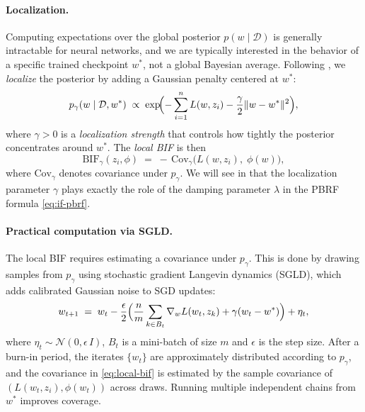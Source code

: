 \documentclass[11pt]{article}
\begin{document}
\paragraph{Localization.} Computing expectations over the global posterior $p(w\mid\mathcal{D})$ is generally intractable for neural networks, and we are typically interested in the behavior of a specific trained checkpoint $w^*$, not a global Bayesian average. Following \citet{kreer2025bif}, we \emph{localize} the posterior by adding a Gaussian penalty centered at $w^*$:
\begin{equation}\label{eq:local-posterior}
  p_\gamma(w\mid\mathcal{D},w^*) \;\propto\; \exp\!\Bigl(-\sum_{i=1}^n L(w,z_i) - \frac{\gamma}{2}\|w - w^*\|^2\Bigr),
\end{equation}
where $\gamma > 0$ is a \emph{localization strength} that controls how tightly the posterior concentrates around $w^*$. The \emph{local BIF} is then
\begin{equation}\label{eq:local-bif}
  \mathrm{BIF}_\gamma(z_i,\phi) \;=\; -\,\mathrm{Cov}_\gamma\bigl(L(w,z_i),\;\phi(w)\bigr),
\end{equation}
where $\mathrm{Cov}_\gamma$ denotes covariance under $p_\gamma$. We will see in  that the localization parameter $\gamma$ plays exactly the role of the damping parameter $\lambda$ in the PBRF formula \eqref{eq:if-pbrf}.

\paragraph{Practical computation via SGLD.} The local BIF requires estimating a covariance under $p_\gamma$. This is done by drawing samples from $p_\gamma$ using stochastic gradient Langevin dynamics (SGLD), which adds calibrated Gaussian noise to SGD updates:
\[
  w_{t+1} \;=\; w_t - \frac{\epsilon}{2}\Bigl(\frac{n}{m}\sum_{k\in B_t}\nabla_w L(w_t,z_k) + \gamma(w_t - w^*)\Bigr) + \eta_t,
\]
where $\eta_t\sim\mathcal{N}(0,\epsilon\, I)$, $B_t$ is a mini-batch of size $m$ and $\epsilon$ is the step size. After a burn-in period, the iterates $\{w_t\}$ are approximately distributed according to $p_\gamma$, and the covariance in \eqref{eq:local-bif} is estimated by the sample covariance of $(L(w_t,z_i),\phi(w_t))$ across draws. Running multiple independent chains from $w^*$ improves coverage.
\end{document}
